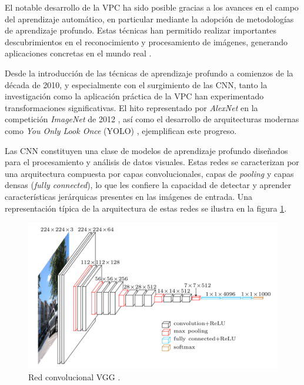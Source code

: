 El notable desarrollo de la VPC ha sido posible gracias a los avances en el campo del aprendizaje automático, en particular mediante la adopción de metodologías de aprendizaje profundo. Estas técnicas han permitido realizar importantes descubrimientos en el reconocimiento y procesamiento de imágenes, generando aplicaciones concretas en el mundo real \citep{dong_applications_2024}.

Desde la introducción de las técnicas de aprendizaje profundo a comienzos de la década de 2010, y especialmente con el surgimiento de las CNN, tanto la investigación como la aplicación práctica de la VPC han experimentado transformaciones significativas. El hito representado por \textit{AlexNet} en la competición \textit{ImageNet} de 2012 \citep{krizhevsky_imagenet_2017}, así como el desarrollo de arquitecturas modernas como \textit{You Only Look Once} (YOLO) \cite{redmon_you_2016}, ejemplifican este progreso.

Las CNN constituyen una clase de modelos de aprendizaje profundo diseñados para el procesamiento y análisis de datos visuales. Estas redes se caracterizan por una arquitectura compuesta por capas convolucionales, capas de \textit{pooling} y capas densas (\textit{fully connected}), lo que les confiere la capacidad de detectar y aprender características jerárquicas presentes en las imágenes de entrada. Una representación típica de la arquitectura de estas redes se ilustra en la figura \ref{fig:vgg}.

\begin{figure}[htpb]
  \centering
  \includegraphics[scale=0.8]{./Figures/vgg.png}
  \caption{Red convolucional VGG \protect\footnotemark.}
  \label{fig:vgg}
\end{figure}


